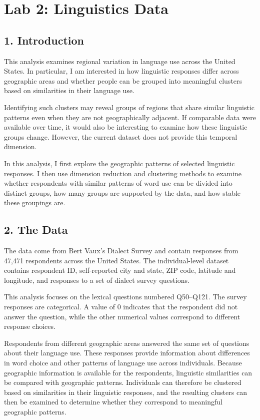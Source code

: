 \documentclass[
]{article}
\author{}
\date{}
\begin{document}
\section{Lab 2: Linguistics Data}\label{lab-2-linguistics-data}

\subsection{1. Introduction}\label{introduction}

This analysis examines regional variation in language use across the
United States. In particular, I am interested in how linguistic
responses differ across geographic areas and whether people can be
grouped into meaningful clusters based on similarities in their language
use.

Identifying such clusters may reveal groups of regions that share
similar linguistic patterns even when they are not geographically
adjacent. If comparable data were available over time, it would also be
interesting to examine how these linguistic groups change. However, the
current dataset does not provide this temporal dimension.

In this analysis, I first explore the geographic patterns of selected
linguistic responses. I then use dimension reduction and clustering
methods to examine whether respondents with similar patterns of word use
can be divided into distinct groups, how many groups are supported by
the data, and how stable these groupings are.

\subsection{2. The Data}\label{the-data}

The data come from Bert Vaux's Dialect Survey and contain responses from
47,471 respondents across the United States. The individual-level
dataset contains respondent ID, self-reported city and state, ZIP code,
latitude and longitude, and responses to a set of dialect survey
questions.

This analysis focuses on the lexical questions numbered Q50--Q121. The
survey responses are categorical. A value of 0 indicates that the
respondent did not answer the question, while the other numerical values
correspond to different response choices.

Respondents from different geographic areas answered the same set of
questions about their language use. These responses provide information
about differences in word choice and other patterns of language use
across individuals. Because geographic information is available for the
respondents, linguistic similarities can be compared with geographic
patterns. Individuals can therefore be clustered based on similarities
in their linguistic responses, and the resulting clusters can then be
examined to determine whether they correspond to meaningful geographic
patterns.
\end{document}
